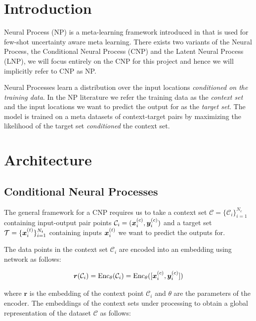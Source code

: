 \documentclass[../../main.tex]{subfiles}
\begin{document}
\section{Introduction}

Neural Process (NP) is a meta-learning framework introduced in \cite{garnelo2018conditional, garnelo2018neural} that is used for few-shot uncertainty aware meta learning. There exists two variants of the Neural Process, the Conditional Neural Process (CNP) and the Latent Neural Process (LNP), we will focus entirely on the CNP for  this project and hence we will implicitly refer to CNP as NP. 

Neural Processes learn a distribution over the input locations \emph{conditioned on the training data}. In the NP literature we refer the training data as the \emph{context set} and the input locations we want to predict the output for as the \emph{target set}. The model is trained on a meta datasets of context-target pairs by maximizing the likelihood of the target set \emph{conditioned} the context set. 
\section{Architecture}

\subsection{Conditional Neural Processes}

The general framework for a CNP requires us to take a context set $\mathcal{C} = \{ \mathcal{C}_i \}_{i=1}^{N_c}$ containing input-output pair points  $\mathcal{C}_i = (\bm{x}_{i}^{(c)}, \bm{y}_i^{(c)}) $ and a target set $\mathcal{T} = \{ \bm{x}_{i}^{(t)} \}_{i=1}^{N_t}$ containing inputs $\bm{x}_{i}^{(t)}$ we want to predict the outputs for.

The data points in the context set $\mathcal{C}_i$ are encoded into an embedding using network as follows:


\begin{equation}
    \bm{r}(\mathcal{C}_i) = \text{Enc}_\theta(\mathcal{C}_i) = \text{Enc}_\theta( [\bm{x}_{i}^{(c)}, \bm{y}_i^{(c)}] )
\end{equation}

where $\bm{r}$ is the embedding of the context point $\mathcal{C}_i$ and $\theta$ are the parameters of the encoder. The embeddings of the context sets under processing to obtain a global representation of the dataset $\mathcal{C}$ as follows: 
\end{document}
